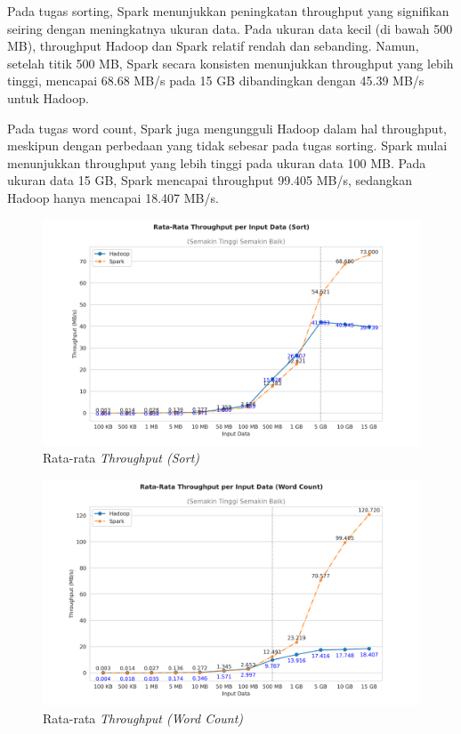 Pada tugas sorting, Spark menunjukkan peningkatan throughput yang signifikan seiring dengan meningkatnya ukuran data. Pada ukuran data kecil (di bawah 500 MB), throughput Hadoop dan Spark relatif rendah dan sebanding. Namun, setelah titik 500 MB, Spark secara konsisten menunjukkan throughput yang lebih tinggi, mencapai 68.68 MB/s pada 15 GB dibandingkan dengan 45.39 MB/s untuk Hadoop. 

Pada tugas word count, Spark juga mengungguli Hadoop dalam hal throughput, meskipun dengan perbedaan yang tidak sebesar pada tugas sorting. Spark mulai menunjukkan throughput yang lebih tinggi pada ukuran data 100 MB.  Pada ukuran data 15 GB, Spark mencapai throughput 99.405 MB/s, sedangkan Hadoop hanya mencapai 18.407 MB/s.

\begin{figure}[h]
    \centering
    \includegraphics[width=1\textwidth]{figures/ch04/2-mean-throughput-sort.png}
    \caption{Rata-rata \textit{Throughput (Sort)}}
    \label{fig:mean-throughput-sort}
\end{figure}

\begin{figure}[h]
    \centering
    \includegraphics[width=1\textwidth]{figures/ch04/2-mean-throughput-wordcount.png}
    \caption{Rata-rata \textit{Throughput (Word Count)}}
    \label{fig:mean-throughput-wordcount}
\end{figure}


